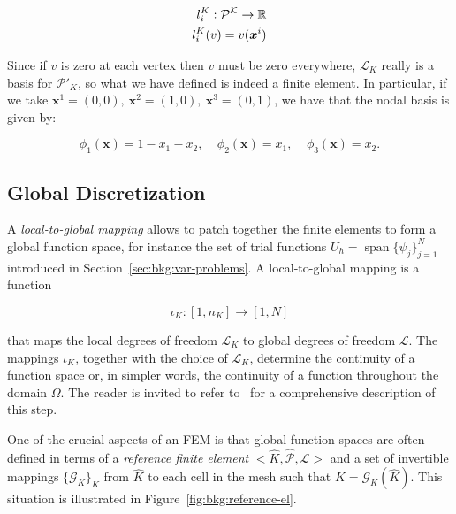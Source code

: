 \begin{equation}
\centering
\begin{split}
l_i^K : \mathcal{P^K} \rightarrow \mathbb{R} \\
l_i^K(v) = v(\boldsymbol{x}^i)
\end{split}
\end{equation}

Since if $v$ is zero at each vertex then $v$ must be zero everywhere, $\mathcal{L}_K$ really is a basis for $\mathcal{P}'_K$, so what we have defined is indeed a finite element. In particular, if we take $\boldsymbol{x}^1 = (0, 0),\ \boldsymbol{x}^2 = (1,0),\ \boldsymbol{x}^3 = (0,1)$, we have that the nodal basis is given by:

\begin{equation}
\phi_1(\boldsymbol{x}) = 1 - x_1 - x_2,\ \ \ \ \ \phi_2(\boldsymbol{x}) = x_1,\ \ \ \ \ \phi_3(\boldsymbol{x}) = x_2.
\end{equation}


\subsection{Global Discretization}
\label{sec:bkg:refel}
A {\em local-to-global mapping} allows to patch together the finite elements to form a global function space, for instance the set of trial functions $U_h = \operatorname{span}\lbrace \psi_j \rbrace_{j=1}^N$ introduced in Section~\ref{sec:bkg:var-problems}. A local-to-global mapping is a function

\begin{equation}
\iota_K : [1,n_K] \rightarrow [1,N]
\end{equation}

that maps the local degrees of freedom $\mathcal{L}_K$ to global degrees of freedom $\mathcal{L}$. The mappings $\iota_K$, together with the choice of $\mathcal{L}_K$, determine the continuity of a function space or, in simpler words, the continuity of a function throughout the domain $\Omega$. The reader is invited to refer to~\cite{Fenics} for a comprehensive description of this step.

One of the crucial aspects of an FEM is that global function spaces are often defined in terms of a {\em reference finite element} ${<}\hat{K}, \hat{\mathcal{P}}, \hat{\mathcal{L}}{>}$ and a set of invertible mappings $\lbrace \mathcal{G}_K\rbrace_{K}$ from $\hat{K}$ to each cell in the mesh such that $K = \mathcal{G}_K(\hat{K})$.  This situation is illustrated in Figure~\ref{fig:bkg:reference-el}.

